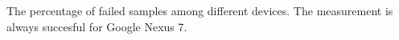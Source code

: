 The percentage of failed samples among different devices. The measurement is always succesful for Google Nexus 7.
